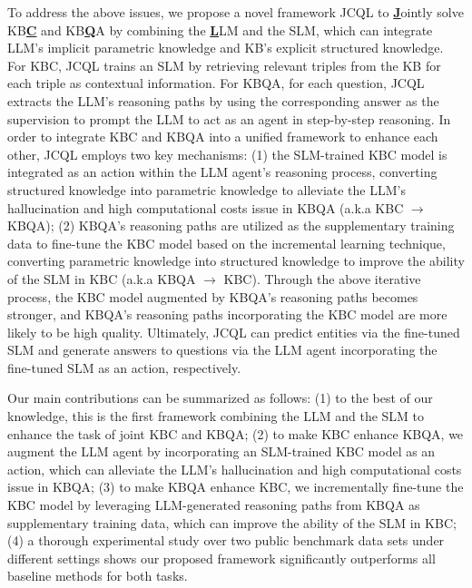 \documentclass[11pt]{article}
\begin{document}
To address the above issues, we propose a novel framework JCQL to \textbf{\underline{J}}ointly solve KB\textbf{\underline{C}} and KB\textbf{\underline{Q}}A by combining the \textbf{\underline{L}}LM and the SLM, which can integrate LLM's implicit parametric knowledge and KB’s explicit structured knowledge. For KBC, JCQL trains an SLM by retrieving relevant triples from the KB for each triple as contextual information. For KBQA, for each question, JCQL extracts the LLM's reasoning paths by using the corresponding answer as the supervision to prompt the LLM to act as an agent in step-by-step reasoning. In order to integrate KBC and KBQA into a unified framework to enhance each other, JCQL employs two key mechanisms: (1) the SLM-trained KBC model is integrated as an action within the LLM agent’s reasoning process, converting structured knowledge into parametric knowledge to alleviate the LLM’s hallucination and high computational costs issue in KBQA (a.k.a KBC $\rightarrow$ KBQA); (2) KBQA's reasoning paths are utilized as the supplementary training data to fine-tune the KBC model based on the incremental learning technique, converting parametric knowledge into structured knowledge to improve the ability of the SLM in KBC (a.k.a KBQA $\rightarrow$ KBC). Through the above iterative process, the KBC model augmented by KBQA's reasoning paths becomes stronger, and KBQA's reasoning paths incorporating the KBC model are more likely to be high quality. Ultimately, JCQL can predict entities via the fine-tuned SLM and generate answers to questions via the LLM agent incorporating the fine-tuned SLM as an action, respectively. 

Our main contributions can be summarized as follows: (1) to the best of our knowledge, this is the first framework combining the LLM and the SLM to enhance the task of joint KBC and KBQA; (2) to make KBC enhance KBQA, we augment the LLM agent by incorporating an SLM-trained KBC model as an action, which can alleviate the LLM's hallucination and high computational costs issue in KBQA; (3) to make KBQA enhance KBC, we incrementally fine-tune the KBC model by leveraging LLM-generated reasoning paths from KBQA as supplementary training data, which can improve the ability of the SLM in KBC; (4) a thorough experimental study over two public benchmark data sets under different settings shows our proposed framework significantly outperforms all baseline methods for both tasks.
\end{document}
